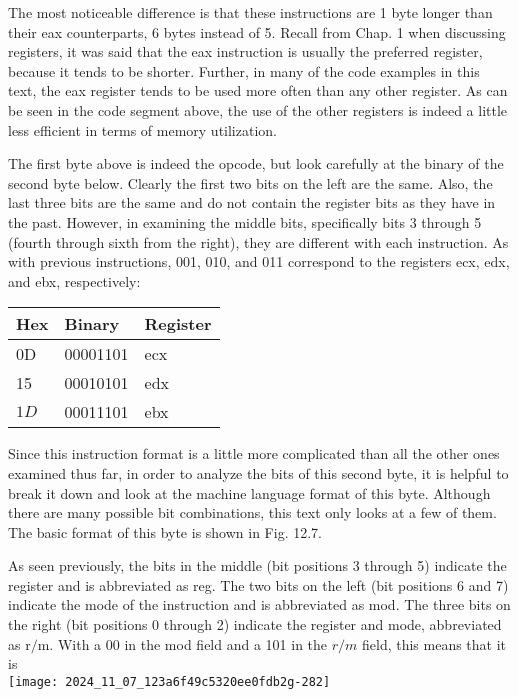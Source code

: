 \documentclass[10pt]{article}
\begin{document}
The most noticeable difference is that these instructions are 1 byte longer than their eax counterparts, 6 bytes instead of 5. Recall from Chap. 1 when discussing registers, it was said that the eax instruction is usually the preferred register, because it tends to be shorter. Further, in many of the code examples in this text, the eax register tends to be used more often than any other register. As can be seen in the code segment above, the use of the other registers is indeed a little less efficient in terms of memory utilization.

The first byte above is indeed the opcode, but look carefully at the binary of the second byte below. Clearly the first two bits on the left are the same. Also, the last three bits are the same and do not contain the register bits as they have in the past. However, in examining the middle bits, specifically bits 3 through 5 (fourth through sixth from the right), they are different with each instruction. As with previous instructions, 001, 010, and 011 correspond to the registers ecx, edx, and ebx, respectively:

\begin{center}
\begin{tabular}{|l|l|l|}
\hline
Hex & Binary & Register \\
\hline
0D & 00001101 & ecx \\
\hline
15 & 00010101 & edx \\
\hline
$1 D$ & 00011101 & ebx \\
\hline
\end{tabular}
\end{center}

Since this instruction format is a little more complicated than all the other ones examined thus far, in order to analyze the bits of this second byte, it is helpful to break it down and look at the machine language format of this byte. Although there are many possible bit combinations, this text only looks at a few of them. The basic format of this byte is shown in Fig. 12.7.

As seen previously, the bits in the middle (bit positions 3 through 5) indicate the register and is abbreviated as reg. The two bits on the left (bit positions 6 and 7) indicate the mode of the instruction and is abbreviated as mod. The three bits on the right (bit positions 0 through 2) indicate the register and mode, abbreviated as $\mathrm{r} / \mathrm{m}$. With a 00 in the mod field and a 101 in the $r / m$ field, this means that it is\\
\texttt{[image: 2024\_11\_07\_123a6f49c5320ee0fdb2g-282]}
\end{document}
